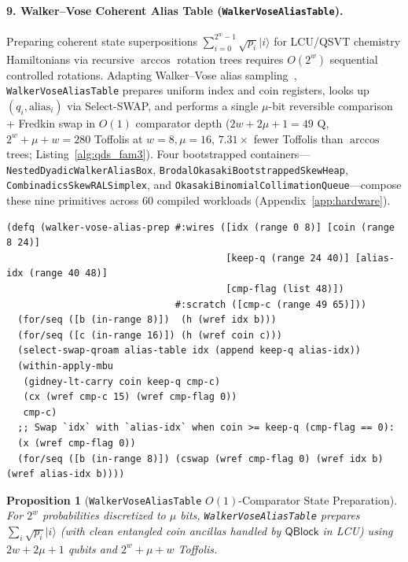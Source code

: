 \documentclass[acmsmall,screen,anonymous]{acmart}
\DeclareRobustCommand{\_}{\ifmmode\text{\char95}\else\char95\penalty0\relax\fi}
\theoremstyle{plain}
\newtheorem{proposition}[theorem]{Proposition}
\newcommand{\QBlock}{\ensuremath{\mathsf{QBlock}}}
\begin{document}
\paragraph{9. Walker--Vose Coherent Alias Table (\texttt{WalkerVoseAliasTable}).}
Preparing coherent state superpositions $\sum_{i=0}^{2^w - 1} \sqrt{p_i}|i\rangle$ for LCU/QSVT chemistry Hamiltonians via recursive $\arccos$ rotation trees requires $O(2^w)$ sequential controlled rotations. Adapting Walker--Vose alias sampling~\cite{walker1977,vose1991,babbush2018}, \texttt{WalkerVoseAliasTable} prepares uniform index and coin registers, looks up $(q_i, \mathrm{alias}_i)$ via Select-SWAP, and performs a single $\mu$-bit reversible comparison + Fredkin swap in $O(1)$ comparator depth ($2w + 2\mu + 1 = 49\text{ Q}$, $2^w + \mu + w = 280$ Toffolis at $w=8, \mu=16$, $7.31\times$ fewer Toffolis than $\arccos$ trees; Listing~\ref{alg:qds_fam3}). Four bootstrapped containers---\texttt{NestedDyadicWalkerAliasBox}, \texttt{BrodalOkasakiBootstrappedSkewHeap}, \texttt{CombinadicsSkewRALSimplex}, and \texttt{OkasakiBinomialCollimationQueue}---compose these nine primitives across 60 compiled workloads (Appendix~\ref{app:hardware}).

\begin{lstlisting}[language=LakefillLisp,caption={Coherent Walker--Vose alias state preparation in \texttt{\#lang lakefillq}: $O(1)$-comparator Select-SWAP + Fredkin swap with Law-$\mathsf{U4}$ MBU scratch erasure.},label={alg:qds_fam3}]
(defq (walker-vose-alias-prep #:wires ([idx (range 0 8)] [coin (range 8 24)]
                                       [keep-q (range 24 40)] [alias-idx (range 40 48)]
                                       [cmp-flag (list 48)])
                              #:scratch ([cmp-c (range 49 65)]))
  (for/seq ([b (in-range 8)])  (h (wref idx b)))
  (for/seq ([c (in-range 16)]) (h (wref coin c)))
  (select-swap-qroam alias-table idx (append keep-q alias-idx))
  (within-apply-mbu
   (gidney-lt-carry coin keep-q cmp-c)
   (cx (wref cmp-c 15) (wref cmp-flag 0))
   cmp-c)
  ;; Swap `idx` with `alias-idx` when coin >= keep-q (cmp-flag == 0):
  (x (wref cmp-flag 0))
  (for/seq ([b (in-range 8)]) (cswap (wref cmp-flag 0) (wref idx b) (wref alias-idx b))))
\end{lstlisting}

\begin{proposition}[\texttt{WalkerVoseAliasTable} $O(1)$-Comparator State Preparation]
\label{prop:p3_9}
For $2^w$ probabilities discretized to $\mu$ bits, \texttt{WalkerVoseAliasTable} prepares $\sum_i \sqrt{p_i}|i\rangle$ (with clean entangled coin ancillas handled by $\QBlock$ in LCU) using $2w + 2\mu + 1$ qubits and $2^w + \mu + w$ Toffolis.
\end{proposition}
\end{document}
